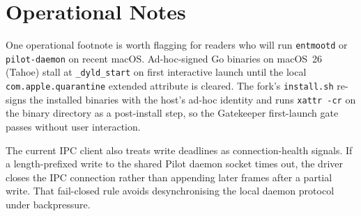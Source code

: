 \documentclass[11pt,a4paper,twocolumn]{article}
\begin{document}
\appendix
\section{Operational Notes}
\label{app:operational-notes}

One operational footnote is worth flagging for readers who will run
\texttt{entmootd} or \texttt{pilot-daemon} on recent macOS. Ad-hoc-signed Go
binaries on macOS~26 (Tahoe) stall at \texttt{\_dyld\_start} on first
interactive launch until the local \texttt{com.apple.quarantine} extended
attribute is cleared. The fork's \texttt{install.sh} re-signs the installed
binaries with the host's ad-hoc identity and runs \texttt{xattr -cr} on the
binary directory as a post-install step, so the Gatekeeper first-launch gate
passes without user interaction.

The current IPC client also treats write deadlines as connection-health
signals. If a length-prefixed write to the shared Pilot daemon socket times out,
the driver closes the IPC connection rather than appending later frames after a
partial write. That fail-closed rule avoids desynchronising the local daemon
protocol under backpressure.



\end{document}
